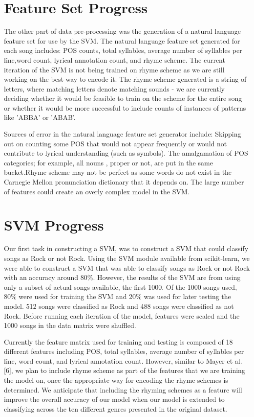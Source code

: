 \documentclass[journal]{IEEEtran}
\begin{document}
\section{Feature Set Progress}

The other part of data pre-processing was the generation of a natural language feature set for use by the SVM. The natural language feature set generated for each song  includes: POS counts, total syllables, average number of syllables per line,word count, lyrical annotation count, and rhyme scheme. The current iteration of the SVM is not being trained on rhyme scheme as we are still working on the best way to encode it. The rhyme scheme generated is a string of letters, where matching letters denote matching sounds - we are currently deciding whether it would be feasible to train on the scheme for the entire song or whether it would be more successful to include counts of instances of patterns like 'ABBA' or 'ABAB'.

Sources of error in the natural language feature set generator include: Skipping out on counting some POS that would not appear frequently or would not contribute to lyrical understanding (such as symbols). The amalgamation of POS categories; for example, all nouns , proper or not, are put in the same bucket.Rhyme scheme may not be perfect as some words do not exist in the Carnegie Mellon pronunciation dictionary that it depends on. The large number of features could create an overly complex model in the SVM.

\section{SVM Progress}

Our first task in constructing a SVM, was to construct a SVM that could classify songs as Rock or not Rock. Using the SVM module available from scikit-learn, we were able to construct a SVM that was able to classify songs as Rock or not Rock with an accuracy around 80\%. However, the results of the SVM are from using only a subset of actual songs available, the first 1000. Of the 1000 songs used, 80\% were used for training the SVM and 20\% was used for later testing the model. 512 songs were classified as Rock and 488 songs were classified as not Rock. Before running each iteration of the model, features were scaled and the 1000 songs in the data matrix were shuffled. 

Currently the feature matrix used for training and testing is composed of 18 different features including POS, total syllables, average number of syllables per line, word count, and lyrical annotation count. However, similar to Mayer et al. [6], we plan to include rhyme scheme as part of the features that we are training the model on, once the appropriate way for encoding the rhyme schemes is determined. We anticipate that including the rhyming schemes as a feature will improve the overall accuracy of our model when our model is extended to classifying across the ten different genres presented in the original dataset.
\end{document}
